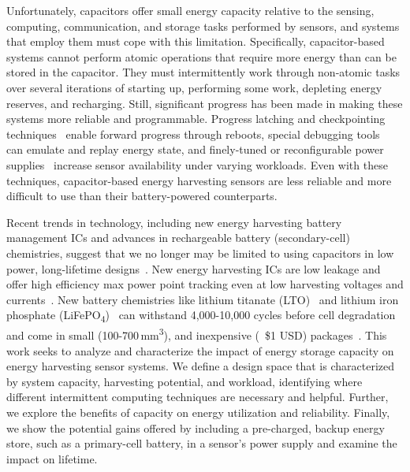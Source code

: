 Unfortunately, capacitors offer
small energy capacity relative to the sensing, computing, communication, and storage tasks
performed by sensors, and systems that employ them must cope with this limitation.
Specifically, capacitor-based systems cannot perform atomic operations that require
more energy than can be stored in the capacitor.
They must intermittently work through non-atomic tasks over
several iterations of starting up, performing some work,
depleting energy reserves, and recharging. Still, significant progress
has been made in making these systems more reliable and programmable.
Progress latching and checkpointing techniques~\cite{lucia2015simpler, ransford2012mementos} enable forward progress through reboots,
special debugging tools~\cite{colin2016energy} can emulate and replay energy state, and finely-tuned
or reconfigurable power supplies~\cite{hesterFlicker17, colinReconfigurable18} increase sensor availability under varying
workloads. Even with these techniques, capacitor-based energy harvesting
sensors are less reliable and more difficult to use than their battery-powered
counterparts.

Recent trends in technology, including new energy harvesting battery management
ICs and advances in rechargeable battery (secondary-cell) chemistries, suggest that we no longer may be
limited to using capacitors in low power, long-lifetime
designs~\cite{jackson2018reconsidering}. New energy harvesting
ICs are low leakage and offer high efficiency max power point tracking even at low
harvesting voltages and currents~\cite{bq25505, adp5091}. New battery chemistries like lithium
titanate (LTO)~\cite{LTODatasheet} and lithium iron phosphate
(LiFePO\textsubscript{4})~\cite{30mahlifepo} can withstand 4,000-10,000 cycles
before cell degradation~\cite{wangCycle11, omarLithium14} and come in small
(100-700\,mm\textsuperscript{3}), and inexpensive (~\$1 USD) packages~\cite{LTODatasheet, LTODatasheet2}.
This work seeks to analyze and characterize the impact of energy
storage capacity on energy harvesting sensor systems.  We define a design
space that is characterized by system capacity, harvesting potential, and
workload,
identifying where different intermittent computing techniques are necessary and
helpful. Further, we explore the benefits of capacity on energy utilization and
reliability.
Finally, we show the potential gains offered by including a pre-charged, backup
energy store, such as a primary-cell battery, in a sensor's power supply and
examine the impact on lifetime.


